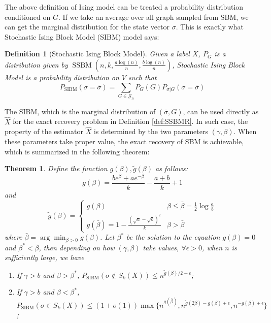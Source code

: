 \documentclass[journal]{IEEEtran}
\newtheorem{theorem}{Theorem}
\newtheorem{definition}{Definition}
\newcommand{\A}{\frac{a \log(n)}{n}}
\newcommand{\B}{\frac{b \log(n)}{n}}
\newcommand{\cG}{\mathcal{G}}
\newcommand{\1}{\mathbbm{1}}
\DeclareMathOperator{\SSBM}{SSBM}
\DeclareMathOperator{\SIBM}{SIBM}
\begin{document}
The above definition of Ising model can be treated a probability distribution conditioned on $G$.
If we take an average over all graph sampled from SBM, we can get the marginal distribution for the state vector $\sigma$.
This is exactly what Stochastic Ising Block Model (SIBM) model says:
\begin{definition}[Stochastic Ising Block Model]
	Given a label $X$, $P_G$ is a distribution given by $\SSBM(n,k,\A,\B)$, Stochastic Ising Block Model
	is a probability distribution on $V$ such that
\begin{equation}\label{eq:sibm}
P_{\SIBM}(\sigma = \bar{\sigma}) = \sum_{G \in \cG_n} P_G(G) P_{\sigma | G}(\sigma = \bar{\sigma}) 
\end{equation}
\end{definition}
The SIBM, which is the marginal distribution of $(\bar{\sigma}, G)$, can be used directly as $\hat{X}$ for the exact recovery problem in Definition \ref{def:SSBMR}.  In such case, the property of the estimator $\hat{X}$ is determined
by the two parameters $(\gamma, \beta)$. When these parameters take proper value, the exact recovery of SBM is achievable, which is summarized in the following theorem:
\begin{theorem}\label{thm:phase_transition}
Define the function $g(\beta), \tilde{g}(\beta)$ as follows:
\begin{equation}
g(\beta) = \frac{be^{\beta} + a e^{-\beta}}{k} - \frac{a+b}{k} +1
\end{equation}
and
\begin{equation}
\tilde{g}(\beta) = \begin{cases}
g(\beta) & \beta \leq \bar{\beta} = \frac{1}{2}\log \frac{a}{b} \\
g(\bar{\beta}) = 1 - \frac{(\sqrt{a} - \sqrt{b})^2}{k} & \beta > \bar{\beta}
\end{cases}
\end{equation}
where $\bar{\beta} =  \arg\min_{\beta > 0} g(\beta)$.
Let $\beta^*$ be the solution to the equation $g(\beta) = 0$ and $\beta^* < \bar{\beta}$, then depending on
how $(\gamma, \beta)$ take values, $\forall \epsilon > 0$, when $n$ is sufficiently large, we have
\begin{enumerate}
\item If $\gamma > b$ and $\beta > \beta^*$,  $P_{\SIBM}(\sigma \not\in S_k(X)) \leq n^{\tilde{g}(\beta)/2 + \epsilon}$;
\item If $\gamma > b$ and $\beta < \beta^*$, $P_{\SIBM}(\sigma \in S_k(X)) \leq (1+o(1))\max\{n^{g(\bar{\beta})},
n^{\tilde{g}(2\beta)-g(\beta)+\epsilon}, n^{-g(\beta) + \epsilon}\}$;
\end{enumerate}
\end{theorem}
\end{document}
